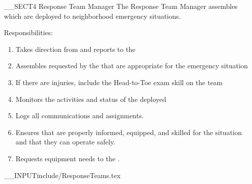 __SECT4{ \large Response Team Manager
\label{sec:ResponseTeamManager} }
The Response Team Manager assembles \ResponseTeams 
which are deployed to neighborhood emergency situations.

Responsibilities: 
\begin{enumerate}
\item Takes direction from and reports to the \OperationsSectionChief 
\item Assembles \ResponseTeams requested by the \OperationsSectionChief that are appropriate for the emergency situation
\item If there are injuries, include the Head-to-Toe exam skill on the team
\item Monitors the activities and status of the deployed \ResponseTeams 
\item Logs all communications and assignments.
\item Ensures that \ResponseTeams are properly informed, equipped, and skilled for the situation and that they can operate safely.
\item Requests equipment needs to the \OperationsSectionChief.
\end{enumerate}
__INPUT{include/ResponseTeams.tex}
